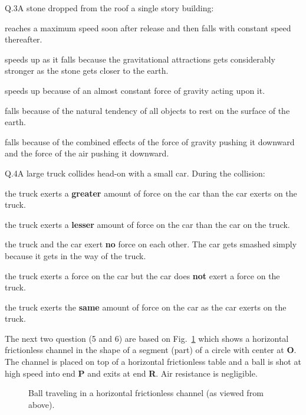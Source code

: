     \begin{mcq}{Q.3}{A stone dropped from the roof a single story building:}

            \item reaches a maximum speed soon after release and then falls with constant speed thereafter.
            \item speeds up as it falls because the gravitational attractions gets considerably stronger as the stone gets closer to the earth.
            \item speeds up because of an almost constant force of gravity acting upon it.
            \item falls because of the natural tendency of all objects to rest on the surface of the earth.
            \item falls because of the combined effects of the force of gravity pushing it downward and the force of the air pushing it downward.
    \end{mcq}


    \begin{mcq}{Q.4}{A large truck collides head-on with a small car. During the collision:}

        \item the truck exerts a \textbf{greater} amount of force on the car than the car exerts on the truck.
        \item the truck exerts a \textbf{lesser} amount of force on the car than the car on the truck.
        \item the truck and the car exert \textbf{no} force on each other. The car gets smashed simply because it gets in the way of the truck.
        \item the truck exerts a force on the car but the car does \textbf{not} exert a force on the truck.
        \item the truck exerts the \textbf{same} amount of force on the car as the car exerts on the truck.
    \end{mcq}

    \eline[2]
    The next two question (5 and 6) are based on Fig.~\ref{fig:circular_channel} which shows a horizontal frictionless channel in the shape of a segment (part) of a circle with center at \textbf{O}.
    The channel is placed on top of a horizontal frictionless table and a ball is shot at high speed into end \textbf{P} and exits at end \textbf{R}.
    Air resistance is negligible.

    \begin{figure}[h!]
        \begin{center}
            \eline[]
            
            \caption{\label{fig:circular_channel} Ball traveling in a horizontal frictionless channel (as viewed from above).}
        \end{center}
    \end{figure}

